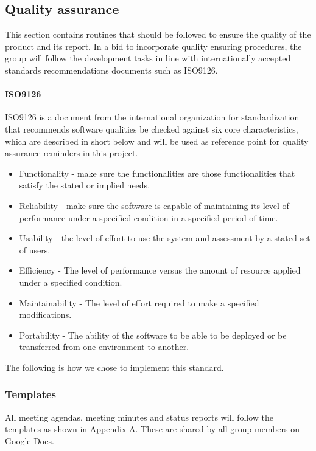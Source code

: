 \subsection{Quality assurance}

This section contains routines that should be followed to ensure the
quality of the product and its report. In a bid to incorporate quality ensuring
procedures, the group will follow the development tasks in line with
internationally accepted standards recommendations documents such as ISO9126.

\paragraph{ISO9126}
ISO9126 is a document from the international organization for standardization
that recommends software qualities be checked against six core characteristics,
which are described in short below and will be used as reference point for
quality assurance reminders in this project\cite{iso:9126}. 

\begin{itemize}
		\item Functionality - make sure the functionalities are those functionalities that satisfy the stated or implied needs.
		\item Reliability - make sure the software is capable of maintaining its level of performance under a specified condition in a specified period of time.
		\item Usability - the level of effort to use the system and assessment by a stated set of users.
		\item Efficiency - The level of performance versus the amount of resource applied under a specified condition.
        \item Maintainability - The level of effort required to make a specified modifications.
        \item Portability - The ability of the software to be able to be deployed or be transferred from one environment to another.
\end{itemize}

The following is how we chose to implement this standard.

\subsubsection{Templates}
All meeting agendas, meeting minutes and status reports will follow the
templates as shown in Appendix A. These are shared by all group members on
Google Docs. 

